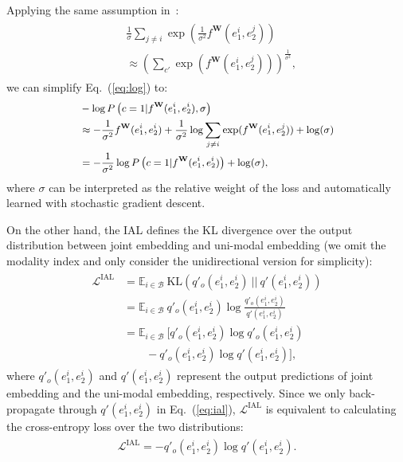 \documentclass[11pt]{article}
\begin{document}
Applying the same assumption in~\cite{kendall2018multi}:
\begin{gather}
\begin{aligned}
    &\frac{1}{\sigma}\sum_{j\neq i}\exp\left(
    \frac{1}{\sigma^2}f^{\mathbf{W}}(e^i_1,e^j_2)
    \right) \\
    &\approx
    \left(
    \sum_{c'}\exp\left(f^{\mathbf{W}}(e^i_1,e^j_2)\right)
    \right)^{\frac{1}{\sigma^2}},
\end{aligned}
\end{gather}
we can simplify Eq.~(\ref{eq:log}) to:
\begin{gather}
\begin{small}
\begin{aligned}
    &-\log P\left(c=1|f^{\mathbf{W}}(e^i_1,e^i_2), \sigma\right) \\
&\approx -\frac{1}{\sigma^2}f^{\mathbf{W}}(e^i_1,e^i_2)
    + \frac{1}{\sigma^2}\log\sum_{j\neq i}\exp(f^{\mathbf{W}}(e^i_1,e^j_2)) + \log(\sigma) \\
    &= -\frac{1}{\sigma^2} \log P\left(c=1|f^{\mathbf{W}}(e^i_1,e^i_2)\right) + \log(\sigma),
\label{eq:approx}
\end{aligned}
\end{small}
\end{gather}
where $\sigma$ can be interpreted as the relative weight of the loss and automatically learned with stochastic gradient descent.

On the other hand, the IAL defines the KL divergence over the output distribution
between joint embedding and uni-modal embedding (we omit the modality index and only consider the unidirectional version for simplicity):
\begin{gather}
\begin{aligned}
    \mathcal{L}^{\text{IAL}} &=\mathbb{E}_{i\in\mathcal{B}}\ 
    \text{KL} (q'_o(e^i_1,e^i_2)\ ||\ q'(e^i_1,e^i_2)) \\
    &= \mathbb{E}_{i\in\mathcal{B}}\ 
    q'_o(e^i_1,e^i_2)\log\frac{q'_o(e^i_1,e^i_2)}{q'(e^i_1,e^i_2)} \\
    &= \mathbb{E}_{i\in\mathcal{B}}\ 
    [q'_o(e^i_1,e^i_2)\log q'_o(e^i_1,e^i_2) \\
    &\quad\quad - q'_o(e^i_1,e^i_2)\log q'(e^i_1,e^i_2)],
\end{aligned}
\end{gather}
where $q'_o(e^i_1,e^i_2)$ and $q'(e^i_1,e^i_2)$ represent the output predictions of joint embedding and the uni-modal embedding, respectively.
Since we only back-propagate through $q'(e^i_1,e^i_2)$ in Eq.~(\ref{eq:ial}), $\mathcal{L}^{\text{IAL}}$ is equivalent to calculating the cross-entropy loss over the two distributions:
\begin{gather}
\begin{aligned}
    \mathcal{L}^{\text{IAL}} = - q'_o(e^i_1,e^i_2)\log q'(e^i_1,e^i_2).
\end{aligned}
\end{gather}
\end{document}
